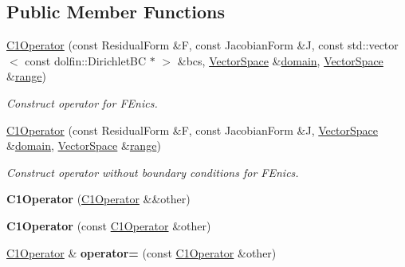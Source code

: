 \subsection*{Public Member Functions}
\begin{DoxyCompactItemize}
\item 
\hyperlink{classSpacy_1_1FEniCS_1_1C1Operator_af23d84bd48d0902011bf80ba2f4cd394}{C1\+Operator} (const Residual\+Form \&F, const Jacobian\+Form \&J, const std\+::vector$<$ const dolfin\+::\+Dirichlet\+B\+C $\ast$ $>$ \&bcs, \hyperlink{classSpacy_1_1VectorSpace}{Vector\+Space} \&\hyperlink{classSpacy_1_1OperatorBase_a2588f9b3e0188820c4c494e63293dc6f}{domain}, \hyperlink{classSpacy_1_1VectorSpace}{Vector\+Space} \&\hyperlink{classSpacy_1_1OperatorBase_ab19d3b7a6f290b1079248f1e567e53d6}{range})
\begin{DoxyCompactList}\small\item\em Construct operator for F\+Enics. \end{DoxyCompactList}\item 
\hyperlink{classSpacy_1_1FEniCS_1_1C1Operator_afe6c4eb8960290212a16a1eca2267b48}{C1\+Operator} (const Residual\+Form \&F, const Jacobian\+Form \&J, \hyperlink{classSpacy_1_1VectorSpace}{Vector\+Space} \&\hyperlink{classSpacy_1_1OperatorBase_a2588f9b3e0188820c4c494e63293dc6f}{domain}, \hyperlink{classSpacy_1_1VectorSpace}{Vector\+Space} \&\hyperlink{classSpacy_1_1OperatorBase_ab19d3b7a6f290b1079248f1e567e53d6}{range})
\begin{DoxyCompactList}\small\item\em Construct operator without boundary conditions for F\+Enics. \end{DoxyCompactList}\item 
\hypertarget{classSpacy_1_1FEniCS_1_1C1Operator_a4ab2b79f50f05b4cc4403269dad87e1e}{}{\bfseries C1\+Operator} (\hyperlink{classSpacy_1_1FEniCS_1_1C1Operator}{C1\+Operator} \&\&other)\label{classSpacy_1_1FEniCS_1_1C1Operator_a4ab2b79f50f05b4cc4403269dad87e1e}

\item 
\hypertarget{classSpacy_1_1FEniCS_1_1C1Operator_a8bedc9295f43ebe21be9e2a9337da1e5}{}{\bfseries C1\+Operator} (const \hyperlink{classSpacy_1_1FEniCS_1_1C1Operator}{C1\+Operator} \&other)\label{classSpacy_1_1FEniCS_1_1C1Operator_a8bedc9295f43ebe21be9e2a9337da1e5}

\item 
\hypertarget{classSpacy_1_1FEniCS_1_1C1Operator_a1e74d332b9cb30ed83d757a39453c47c}{}\hyperlink{classSpacy_1_1FEniCS_1_1C1Operator}{C1\+Operator} \& {\bfseries operator=} (const \hyperlink{classSpacy_1_1FEniCS_1_1C1Operator}{C1\+Operator} \&other)\label{classSpacy_1_1FEniCS_1_1C1Operator_a1e74d332b9cb30ed83d757a39453c47c}


\end{DoxyCompactItemize}
